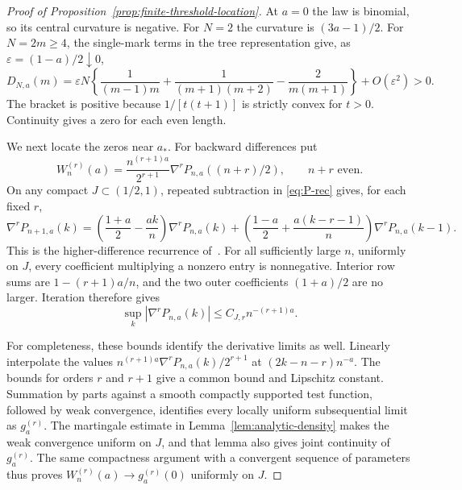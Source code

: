 \begin{proof}[Proof of Proposition~\ref{prop:finite-threshold-location}]
At $a=0$ the law is binomial, so its central curvature is negative.
For $N=2$ the curvature is $(3a-1)/2$.
For $N=2m\ge4$, the single-mark terms in the tree representation give,
as $\varepsilon=(1-a)/2\downarrow0$,
\[
 D_{N,a}(m)=\varepsilon N
 \left\{\frac1{(m-1)m}+\frac1{(m+1)(m+2)}
                   -\frac2{m(m+1)}\right\}+O(\varepsilon^2)>0.
\]
The bracket is positive because $1/[t(t+1)]$ is strictly convex
for $t>0$. Continuity gives a zero for each even length.

We next locate the zeros near $a_*$. For backward differences put
\[
 W_n^{(r)}(a)=\frac{n^{(r+1)a}}{2^{r+1}}
       \nabla^rP_{n,a}((n+r)/2),\qquad n+r\text{ even}.
\]
On any compact $J\subset(1/2,1)$, repeated subtraction in
\eqref{eq:P-rec} gives, for each fixed $r$,
\[
 \nabla^rP_{n+1,a}(k)
 =\left(\frac{1+a}{2}-\frac{ak}{n}\right)\nabla^rP_{n,a}(k)
 +\left(\frac{1-a}{2}+\frac{a(k-r-1)}n\right)
                         \nabla^rP_{n,a}(k-1).
\]
This is the higher-difference recurrence of~\cite[(4.10)]{tv2026}.
For all sufficiently large $n$, uniformly on $J$, every coefficient
multiplying a nonzero entry is nonnegative. Interior row sums are
$1-(r+1)a/n$, and the two outer coefficients $(1+a)/2$ are no larger.
Iteration therefore gives
\begin{equation}\label{eq:finite-difference-bound}
 \sup_k|\nabla^rP_{n,a}(k)|\le C_{J,r}n^{-(r+1)a}.
\end{equation}

For completeness, these bounds identify the derivative limits as well.
Linearly interpolate the values
$n^{(r+1)a}\nabla^rP_{n,a}(k)/2^{r+1}$ at
$(2k-n-r)n^{-a}$. The bounds for orders $r$ and $r+1$ give a
common bound and Lipschitz constant. Summation by parts against a
smooth compactly supported test function, followed by weak convergence,
identifies every locally uniform subsequential limit as $g_a^{(r)}$.
The martingale estimate in Lemma~\ref{lem:analytic-density} makes
the weak convergence uniform on $J$, and that lemma also gives joint
continuity of $g_a^{(r)}$. The same compactness argument with a
convergent sequence of parameters thus proves
$W_n^{(r)}(a)\to g_a^{(r)}(0)$ uniformly on $J$.


\end{proof}
